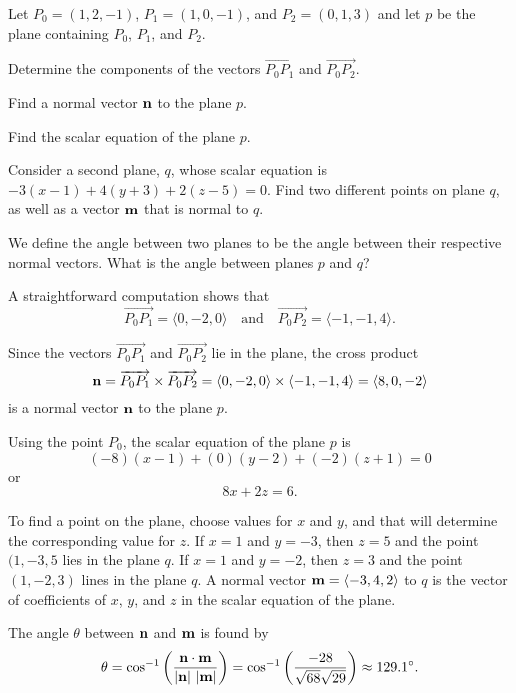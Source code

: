 \begin{activity} \label{A:9.5.7}  	Let $P_0 = (1,2,-1)$, $P_1 = (1, 0 ,-1)$, and $P_2 = (0,1,3)$ and let $p$ be the plane containing $P_0$, $P_1$, and $P_2$.
	\ba
	\item Determine the components of the vectors $\overrightarrow{P_0P_1}$ and $\overrightarrow{P_0P_2}$.	
	\item Find a normal vector $\mathbf{n}$ to the plane $p$.
	\item Find the scalar equation of the plane $p$.
	\item Consider a second plane, $q$, whose scalar equation is $-3(x-1) + 4(y+3) + 2(z-5)=0$.  Find two different points on plane $q$, as well as a vector $\mathbf{m}$ that is normal to $q$.
	\item We define the angle between two planes to be the angle between their respective normal vectors.  What is the angle between planes $p$ and $q$? 

	\ea


\end{activity}
\begin{smallhint}

\end{smallhint}
\begin{bighint}

\end{bighint}
\begin{activitySolution}
	\ba
	\item A straightforward computation shows that 
\[\overrightarrow{P_0P_1} = \langle 0, -2, 0 \rangle \ \ \ \text{ and } \ \ \ \overrightarrow{P_0P_2} = \langle -1, -1, 4 \rangle.\]	
	\item Since the vectors $\overrightarrow{P_0P_1}$ and $\overrightarrow{P_0P_2}$ lie in the plane, the cross product 
\[\mathbf{n} = \overrightarrow{P_0P_1} \times \overrightarrow{P_0P_2} = \langle 0, -2, 0 \rangle \times \langle -1, -1, 4 \rangle = \langle 8,0,-2 \rangle\]
is a normal vector $\mathbf{n}$ to the plane $p$.
	\item Using the point $P_0$, the scalar equation of the plane $p$ is
	\[(-8)(x-1)+(0)(y-2) +(-2)(z+1) = 0\]
	or
	\[8x+2z=6.\]
	\item To find a point on the plane, choose values for $x$ and $y$, and that will determine the corresponding value for $z$. If $x=1$ and $y=-3$, then $z=5$ and the point $(1,-3,5$ lies in the plane $q$. If $x=1$ and $y=-2$, then $z=3$ and the point $(1,-2,3)$ lines in the plane $q$. A normal vector $\mathbf{m} = \langle -3, 4, 2 \rangle$ to $q$ is the vector of coefficients of $x$, $y$, and $z$ in the scalar equation of the plane. 
	\item The angle $\theta$ between $\mathbf{n}$ and $\mathbf{m}$ is found by
\[\theta = \cos^{-1}\left(\frac{\mathbf{n} \cdot \mathbf{m}}{|\mathbf{n}| \ |\mathbf{m}|} \right) = \cos^{-1}\left(\frac{-28}{\sqrt{68}\sqrt{29}}\right) \approx 129.1^{\circ}.\]
	\ea
\end{activitySolution}
\aftera
